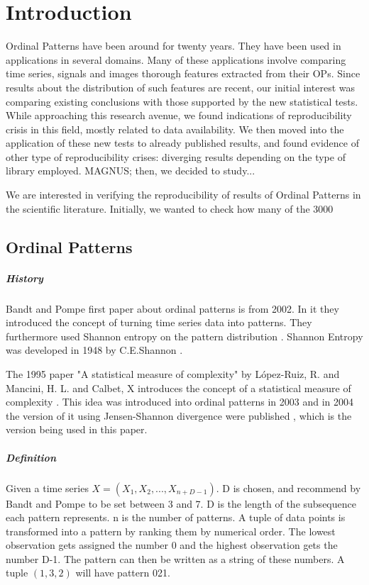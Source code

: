 
\chapter{Introduction}

Ordinal Patterns have been around for twenty years.
They have been used in applications in several domains.
Many of these applications involve comparing time series, signals and images thorough features extracted from their OPs.
Since results about the distribution of such features are recent, our initial interest was comparing existing conclusions with those supported by the new statistical tests.
While approaching this research avenue, we found indications of reproducibility crisis in this field, mostly related to data availability.
We then moved into the application of these new tests to already published results, and found evidence of other type of reproducibility crises: diverging results depending on the type of library employed.
MAGNUS; then, we decided to study...



We are interested in verifying the reproducibility of results of Ordinal Patterns in the scientific literature.
Initially, we wanted to check how many of the 3000

\section{Ordinal Patterns}
\paragraph{History}
Bandt and Pompe first paper about ordinal patterns is from 2002. In it they introduced the concept of turning time series data into patterns. They furthermore used Shannon entropy on the pattern distribution \cite{Bandt2002}. Shannon Entropy was developed in 1948 by C.E.Shannon \cite{Shannon1948}. 

The 1995 paper "A statistical measure of complexity" by López-Ruiz, R. and Mancini, H. L. and Calbet, X introduces the concept of a statistical measure of complexity 
 \cite{LopezRuiz1995}. This idea was introduced into ordinal patterns in 2003 \cite{Martin2003} and in 2004 the version of it using Jensen-Shannon divergence were published \cite{Lamberti2004}, which is the version being used in this paper.

\paragraph{Definition}
Given a time series $X=(X_1,X_2,...,X_{n+D-1})$. D is chosen, and recommend by Bandt and Pompe to be set between 3 and 7. D is the length of the subsequence each pattern represents. n is the number of patterns. A tuple of data points is transformed into a pattern by ranking them by numerical order. The lowest observation gets assigned the number 0 and the highest observation gets the number D-1. The pattern can then be written as a string of these numbers. A tuple $(1,3,2)$ will have pattern 021. 

